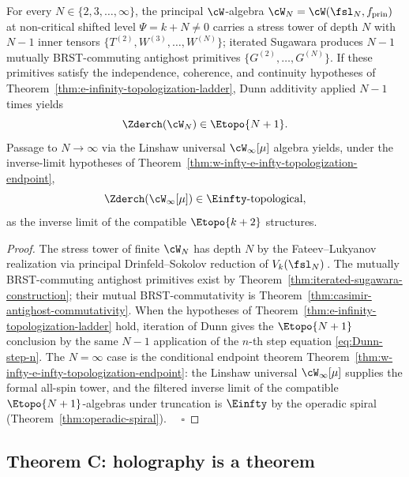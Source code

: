 \begin{theorem}
\label{thm:part-vi-ladder-exists}
For every $N \in \{2, 3, \ldots, \infty\}$, the principal
$\cW$-algebra $\cW_N = \cW(\fsl_N, f_{\mathrm{prin}})$ at non-critical
shifted level $\Psi = k+N \ne 0$ carries a stress tower
of depth $N$ with $N-1$ inner tensors
$\{T^{(2)}, W^{(3)}, \ldots, W^{(N)}\}$; iterated Sugawara produces
$N-1$ mutually BRST-commuting antighost primitives
$\{G^{(2)}, \ldots, G^{(N)}\}$. If these primitives satisfy the
independence, coherence, and continuity hypotheses of
Theorem~\ref{thm:e-infinity-topologization-ladder}, Dunn additivity
applied $N-1$ times yields
\begin{equation}
 \Zderch(\cW_N) \in \Etopo{N+1}.
\end{equation}
Passage to $N \to \infty$ via the Linshaw universal
$\cW_\infty[\mu]$ algebra yields, under the inverse-limit hypotheses of
Theorem~\ref{thm:w-infty-e-infty-topologization-endpoint},
\begin{equation}
 \Zderch(\cW_\infty[\mu]) \in \Einfty\text{-topological},
\end{equation}
as the inverse limit of the compatible $\Etopo{k+2}$ structures.
\end{theorem}
\begin{proof}
The stress tower of finite $\cW_N$ has depth $N$ by the Fateev--Lukyanov
realization via principal Drinfeld--Sokolov reduction of
$V_k(\fsl_N)$\,\cite{FateevLukyanov}. The mutually BRST-commuting
antighost primitives exist by
Theorem~\ref{thm:iterated-sugawara-construction}; their mutual
BRST-commutativity is Theorem~\ref{thm:casimir-antighost-commutativity}.
When the hypotheses of Theorem~\ref{thm:e-infinity-topologization-ladder}
hold, iteration of Dunn gives the $\Etopo{N+1}$ conclusion by the same
$N-1$ application of the $n$-th step equation \eqref{eq:Dunn-step-n}.
The $N=\infty$ case is the conditional endpoint theorem
Theorem~\ref{thm:w-infty-e-infty-topologization-endpoint}: the Linshaw
universal $\cW_\infty[\mu]$ supplies the formal all-spin tower, and
the filtered inverse limit of the compatible $\Etopo{N+1}$-algebras
under truncation is
$\Einfty$ by the operadic spiral (Theorem~\ref{thm:operadic-spiral}).
$\quad\square$
\end{proof}

\subsection{Theorem C: holography is a theorem}
\label{sec:part-vi-theorem-C}

